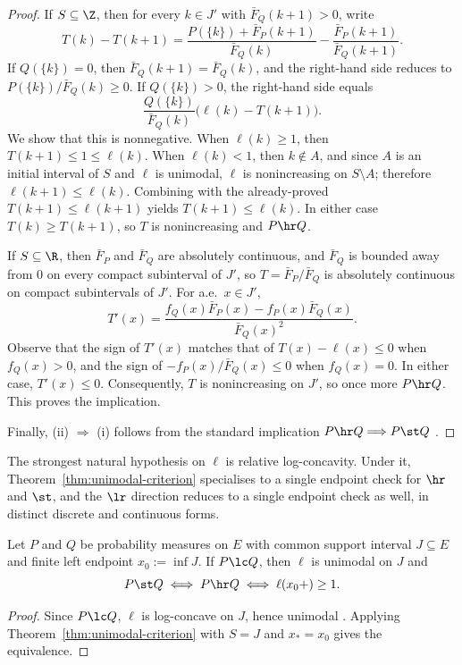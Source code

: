 \documentclass[11pt]{article}
\begin{document}
\begin{proof}
\medskip
\noindent
If $S\subseteq\Z$, then for every $k\in J'$ with $\bar F_Q(k+1)>0$, write
\[
T(k)-T(k+1) = \frac{P(\{k\})+\bar F_P(k+1)}{\bar F_Q(k)} -\frac{\bar F_P(k+1)}{\bar F_Q(k+1)}.
\]
If $Q(\{k\})=0$, then $\bar F_Q(k+1)=\bar F_Q(k)$, and the right-hand side reduces to $P(\{k\})/\bar F_Q(k)\ge 0$. If $Q(\{k\})>0$, the right-hand side equals
\[
\frac{Q(\{k\})}{\bar F_Q(k)}\bigl(\ell(k)-T(k+1)\bigr).
\]
We show that this is nonnegative. When $\ell(k)\ge 1$, then $T(k+1)\le 1\le \ell(k)$. When $\ell(k)<1$, then $k\notin A$, and since $A$ is an initial interval of $S$ and $\ell$ is unimodal, $\ell$ is nonincreasing on $S\setminus A$; therefore $\ell(k+1)\le \ell(k)$. Combining with the already-proved $T(k+1)\le \ell(k+1)$ yields $T(k+1)\le \ell(k)$. In either case $T(k)\ge T(k+1)$, so $T$ is nonincreasing and $P\hr Q$.

\medskip
\noindent
If $S\subseteq\R$, then $\bar F_P$ and $\bar F_Q$ are absolutely continuous, and $\bar F_Q$ is bounded away from $0$ on every compact subinterval of $J'$, so $T=\bar F_P/\bar F_Q$ is absolutely continuous on compact subintervals of $J'$. For a.e.\ $x\in J'$,
\[
T'(x) = \frac{f_Q(x)\bar F_P(x)-f_P(x)\bar F_Q(x)}{\bar F_Q(x)^2}.
\]
Observe that the sign of $T'(x)$ matches that of $T(x)-\ell(x)\le 0$ when $f_Q(x)>0$, and the sign of $-f_P(x)/\bar F_Q(x)\le 0$ when $f_Q(x)=0$. In either case, $T'(x)\le 0$. Consequently, $T$ is nonincreasing on $J'$, so once more $P\hr Q$. This proves the implication.

Finally, \textup{(ii)} $\Longrightarrow$ \textup{(i)} follows from the standard implication $P\hr Q\Longrightarrow P\st Q$ \cite{ShakedShanthikumar}.
\end{proof}

The strongest natural hypothesis on $\ell$ is relative log-concavity. Under it, Theorem~\ref{thm:unimodal-criterion} specialises to a single endpoint check for $\hr$ and $\st$, and the $\lr$ direction reduces to a single endpoint check as well, in distinct discrete and continuous forms.

\begin{cor}\label{cor:lc-endpoints}
Let \(P\) and \(Q\) be probability measures on \(E\) with common support interval \(J\subseteq E\) and finite left endpoint \(x_0:=\inf J\). If \(P\lc Q\), then \(\ell\) is unimodal on \(J\) and
\[
P\st Q \iff P\hr Q \iff \ell(x_0+)\ge 1.
\]
\end{cor}

\begin{proof}
Since \(P\lc Q\), \(\ell\) is log-concave on \(J\), hence unimodal \cite{Karlin1968}. Applying Theorem~\ref{thm:unimodal-criterion} with $S=J$ and $x_*=x_0$ gives the equivalence.
\end{proof}
\end{document}
